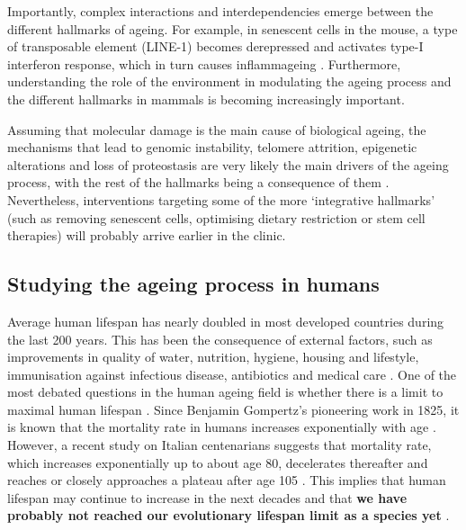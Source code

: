 Importantly, complex interactions and interdependencies emerge between the different hallmarks of ageing. For example, in senescent cells in the mouse, a type of transposable element (LINE-1) becomes derepressed and activates type-I interferon response, which in turn causes inflammageing \cite{DeCecco2019}. Furthermore, understanding the role of the environment in modulating the ageing process and the different hallmarks in mammals is becoming increasingly important.  

\bigskip

Assuming that molecular damage is the main cause of biological ageing, the mechanisms that lead to genomic instability, telomere attrition, epigenetic alterations and loss of proteostasis are very likely the main drivers of the ageing process, with the rest of the hallmarks being a consequence of them \cite{Lopez-Otin2013}. Nevertheless, interventions targeting some of the more `integrative hallmarks' (such as removing senescent cells, optimising dietary restriction or stem cell therapies) will probably arrive earlier in the clinic.

\smallskip

\subsection{Studying the ageing process in humans}

\smallskip

Average human lifespan has nearly doubled in most developed countries during the last 200 years. This has been the consequence of external factors, such as improvements in quality of water, nutrition, hygiene, housing and lifestyle, immunisation against infectious disease, antibiotics and medical care \cite{Partridge2018}. One of the most debated questions in the human ageing field is whether there is a limit to maximal human lifespan \cite{Dong2016}. Since Benjamin Gompertz's pioneering work in 1825, it is known that the mortality rate in humans increases exponentially with age \cite{Gompertz1825}. However, a recent study on Italian centenarians suggests that mortality rate, which increases exponentially up to about age 80, decelerates thereafter and reaches or closely approaches a plateau after age 105 \cite{Barbi2018}. This implies that human lifespan may continue to increase in the next decades and that \textbf{we have probably not reached our evolutionary lifespan limit as a species yet} \cite{Barbi2018,Kontis2017}. 

\bigskip

